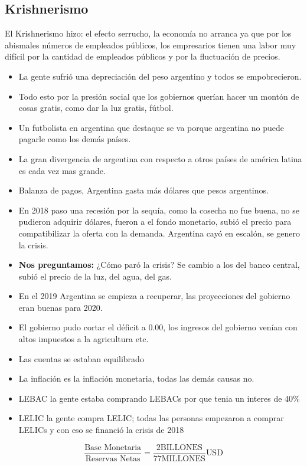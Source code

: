 \subsection{Krishnerismo}
El Krishnerismo hizo: el efecto serrucho, la economía no arranca ya que por los abismales números de empleados públicos, los empresarios tienen una labor muy difícil por la cantidad de empleados públicos y por la fluctuación de precios.
\begin{itemize}
    \item La gente sufrió una depreciación del peso argentino y todos se empobrecieron.
    \item Todo esto por la presión social que los gobiernos querían hacer un montón de cosas gratis, como dar la luz gratis, fútbol.
    \item Un futbolista en argentina que destaque se va porque argentina no puede pagarle como los demás países.
    \item La gran divergencia de argentina con respecto a otros países de américa latina es cada vez mas grande.
    \item Balanza de pagos, Argentina gasta más dólares que pesos argentinos.
    \item En 2018 paso una recesión por la sequía, como la cosecha no fue buena, no se pudieron adquirir dólares, fueron a el fondo monetario, subió el precio para compatibilizar la oferta con la demanda. Argentina cayó en escalón, se genero la crisis.
    \item \textbf{Nos preguntamos:} ¿Cómo paró la crisis? Se cambio a los del banco central, subió el precio de la luz, del agua, del gas.
    \item En el 2019 Argentina se empieza a recuperar, las proyecciones del gobierno eran buenas para 2020.  
    \item El gobierno pudo cortar el déficit a 0.00, los ingresos del gobierno venían con altos impuestos a la agricultura etc.
    \item Las cuentas se estaban equilibrado
    \item La inflación es la inflación monetaria, todas las demás causas no. 
    \item LEBAC la gente estaba comprando LEBACs por que tenia un interes de 40\%
    \item LELIC la gente compra LELIC; todas las personas empezaron a comprar LELICs y con eso se financió la crisis de 2018
\end{itemize}

\[
  \frac{\text{Base Monetaria}}{\text{Reservas Netas}} = \frac{2 \text{BILLONES}}{77\text{MILLONES}} \text{USD} 
\]

